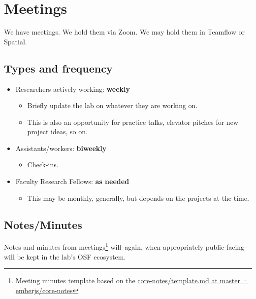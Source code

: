 \documentclass[]{tufte-book}
\providecommand{\tightlist}{%
  \setlength{\itemsep}{0pt}\setlength{\parskip}{0pt}}
\begin{document}
\hypertarget{meetings}{%
\chapter{Meetings}\label{meetings}}

We have meetings. We hold them via Zoom. We may hold them in Teamflow or Spatial.

\hypertarget{types-and-frequency}{%
\section{Types and frequency}\label{types-and-frequency}}

\begin{itemize}
\tightlist
\item
  Researchers actively working: \textbf{weekly}

  \begin{itemize}
  \tightlist
  \item
    Briefly update the lab on whatever they are working on.
  \item
    This is also an opportunity for practice talks, elevator pitches for new project ideas, so on.
  \end{itemize}
\item
  Assistants/workers: \textbf{biweekly}

  \begin{itemize}
  \tightlist
  \item
    Check-ins.
  \end{itemize}
\item
  Faculty Research Fellows: \textbf{as needed}

  \begin{itemize}
  \tightlist
  \item
    This may be monthly, generally, but depends on the projects at the time.
  \end{itemize}
\end{itemize}

\hypertarget{notesminutes}{%
\section{Notes/Minutes}\label{notesminutes}}

Notes and minutes from meetings\footnote{Meeting minutes template based on the \href{https://github.com/emberjs/core-notes/blob/master/learning-team/template.md}{core-notes/template.md at master · emberjs/core-notes}} will--again, when appropriately public-facing--will be kept in the lab's OSF ecosystem.
\end{document}
